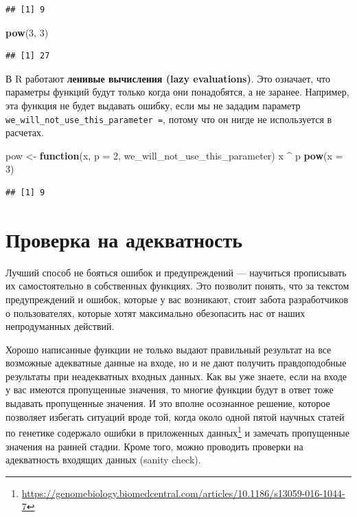 \documentclass[
]{book}
\newenvironment{Shaded}{\begin{snugshade}}{\end{snugshade}}
\newcommand{\ControlFlowTok}[1]{\textcolor[rgb]{0.13,0.29,0.53}{\textbf{#1}}}
\newcommand{\DataTypeTok}[1]{\textcolor[rgb]{0.13,0.29,0.53}{#1}}
\newcommand{\DecValTok}[1]{\textcolor[rgb]{0.00,0.00,0.81}{#1}}
\newcommand{\KeywordTok}[1]{\textcolor[rgb]{0.13,0.29,0.53}{\textbf{#1}}}
\newcommand{\NormalTok}[1]{#1}
\newcommand{\OperatorTok}[1]{\textcolor[rgb]{0.81,0.36,0.00}{\textbf{#1}}}
\newcommand{\StringTok}[1]{\textcolor[rgb]{0.31,0.60,0.02}{#1}}
\renewcommand{\href}[2]{#2\footnote{\url{#1}}}
\begin{document}
\begin{verbatim}
## [1] 9
\end{verbatim}

\begin{Shaded}
\begin{Highlighting}[]
\KeywordTok{pow}\NormalTok{(}\DecValTok{3}\NormalTok{, }\DecValTok{3}\NormalTok{) }
\end{Highlighting}
\end{Shaded}

\begin{verbatim}
## [1] 27
\end{verbatim}

В R работают \textbf{ленивые вычисления (lazy evaluations)}. Это означает, что параметры функций будут только когда они понадобятся, а не заранее. Например, эта функция не будет выдавать ошибку, если мы не зададим параметр \texttt{we\_will\_not\_use\_this\_parameter\ =}, потому что он нигде не используется в расчетах.

\begin{Shaded}
\begin{Highlighting}[]
\NormalTok{pow <-}\StringTok{ }\ControlFlowTok{function}\NormalTok{(x, }\DataTypeTok{p =} \DecValTok{2}\NormalTok{, we_will_not_use_this_parameter) x }\OperatorTok{^}\StringTok{ }\NormalTok{p}
\KeywordTok{pow}\NormalTok{(}\DataTypeTok{x =} \DecValTok{3}\NormalTok{)}
\end{Highlighting}
\end{Shaded}

\begin{verbatim}
## [1] 9
\end{verbatim}

\hypertarget{sanity_check}{%
\section{Проверка на адекватность}\label{sanity_check}}

Лучший способ не бояться ошибок и предупреждений --- научиться прописывать их самостоятельно в собственных функциях. Это позволит понять, что за текстом предупреждений и ошибок, которые у вас возникают, стоит забота разработчиков о пользователях, которые хотят максимально обезопасить нас от наших непродуманных действий.

Хорошо написанные функции не только выдают правильный результат на все возможные адекватные данные на входе, но и не дают получить правдоподобные результаты при неадекватных входных данных. Как вы уже знаете, если на входе у вас имеются пропущенные значения, то многие функции будут в ответ тоже выдавать пропущенные значения. И это вполне осознанное решение, которое позволяет избегать ситуаций вроде той, когда \href{https://genomebiology.biomedcentral.com/articles/10.1186/s13059-016-1044-7}{около одной пятой научных статей по генетике содержало ошибки в приложенных данных} и замечать пропущенные значения на ранней стадии. Кроме того, можно проводить проверки на адекватность входящих данных (sanity check).
\end{document}
